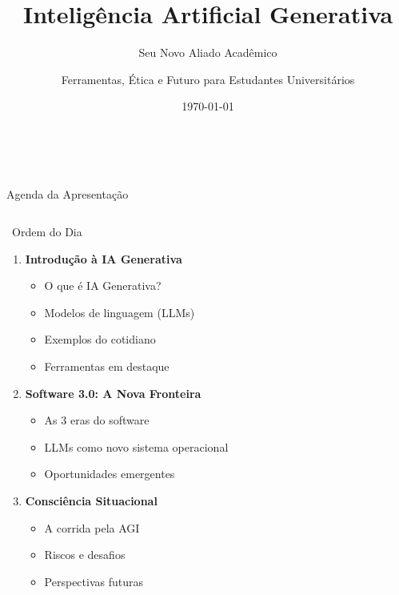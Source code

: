 \documentclass[aspectratio=169,12pt]{beamer}
\title[IA Generativa]{Inteligência Artificial Generativa}
\subtitle{Seu Novo Aliado Acadêmico}
\author{Ferramentas, Ética e Futuro para Estudantes Universitários}
\institute{Unesp}
\date{\today}
\begin{document}

\begin{frame}
    \titlepage
    \begin{center}
        \textcolor{accent}{\faRobot\, \faBrain\, \faGraduationCap}
    \end{center}
\end{frame}


\begin{frame}{Agenda da Apresentação}
    \begin{columns}[T]
        \begin{column}{0.5\textwidth}
            \begin{block}{\faListOl\, Ordem do Dia}
                \begin{enumerate}
                    \item<1-> \textbf{Introdução à IA Generativa}
                    \begin{itemize}
                        \item O que é IA Generativa?
                        \item Modelos de linguagem (LLMs)
                        \item Exemplos do cotidiano
                        \item Ferramentas em destaque
                    \end{itemize}

                    \item<2-> \textbf{Software 3.0: A Nova Fronteira}
                    \begin{itemize}
                        \item As 3 eras do software
                        \item LLMs como novo sistema operacional
                        \item Oportunidades emergentes
                    \end{itemize}

                    \item<3-> \textbf{Consciência Situacional}
                    \begin{itemize}
                        \item A corrida pela AGI
                        \item Riscos e desafios
                        \item Perspectivas futuras
                    \end{itemize}
                \end{enumerate}
            \end{block}
        \end{column}


\end{columns}
\end{frame}
\end{document}
